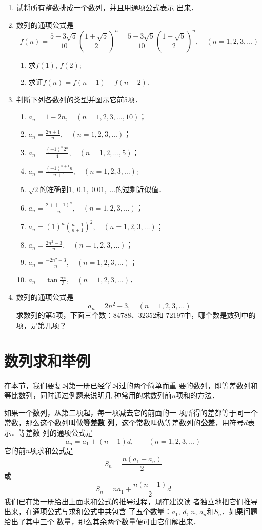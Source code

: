 \begin{enumerate}
\item 试将所有整数排成一个数列，并且用通项公式表示
出来．
\item 数列的通项公式是
\[f(n)=\frac{5+3\sqrt{5}}{10}\left(\frac{1+\sqrt{5}}{2}\right)^n+\frac{5-3\sqrt{5}}{10}\left(\frac{1-\sqrt{5}}{2}\right)^n,\quad (n=1,2,3,\ldots)\]
\begin{enumerate}
    \item 求$f(1)$, $f(2)$;
    \item 求证$f(n)=f(n-1)+f(n-2)$.
\end{enumerate}

\item 判断下列各数列的类型并图示它前5项．
\begin{enumerate}
    \item $a_n=1-2n,\quad (n=1,2,3,\ldots,10)$；
    \item $a_n=\frac{2n+1}{n},\quad (n=1,2,3,\ldots)$；
    \item $a_n=\frac{(-1)^n2^n}{4},\quad (n=1,2,\ldots,5)$；
    \item $a_n=\frac{(-1)^{n+1}n}{n+1},\quad (n=1,2,3,\ldots)$;
    \item $\sqrt{2}$的准确到$1,\; 0.1,\; 0.01,\; \ldots$的过剩近似值．
    \item $a_n=\frac{2+(-1)^n}{n},\quad (n=1,2,3,\ldots)$；
    \item $a_n=(1)^n\left(\frac{n-1}{n+1}\right)^2,\quad (n=1,2,3,\ldots)$；
    \item $a_n=\frac{2n^2-3}{n},\quad (n=1,2,3,\ldots)$；
    \item $a_n=\frac{-2n^2-3}{n},\quad (n=1,2,3,\ldots)$；
    \item $a_n=\tan \frac{n\pi}{3},\quad  (n=1,2,3,\ldots)$．
\end{enumerate}
\item 数列的通项公式是
\[a_n=2n^2-3,\quad (n=1,2,3,\ldots)\]
求数列的第5项，下面三个数：84788、32352和
72197中，哪个数是数列中的项，是第几项？
\end{enumerate}

\section{数列求和举例}
在本节，我们要复习第一册已经学习过的两个简单而重
要的数列，即等差数列和等比数列，同时通过例题来说明几
种常用的求数列前$n$项和的方法．

如果一个数列，从第二项起，每一项减去它的前面的一
项所得的差都等于同一个常数，那么这个数列叫做\textbf{等差数
列}，这个常数叫做等差数列的\textbf{公差}，用符号$d$表示．等差数
列的通项公式是
\[a_n=a_1+(n-1)d,\qquad (n=1,2,3,\ldots)\]
它的前$n$项求和公式是
\[S_n=\frac{n(a_1+a_n)}{2}\]
或
\[S_n=na_1+\frac{n(n-1)}{2}d\]
我们已在第一册给出上面求和公式的推导过程，现在建议读
者独立地把它们推导出来，在通项公式与求和公式中共包含
了五个数量：$a_1$, $d$, $n$, $a_n$和$S_n$．如果问题给出了其中三个
数量，那么其余两个数量便可由它们解出来．

